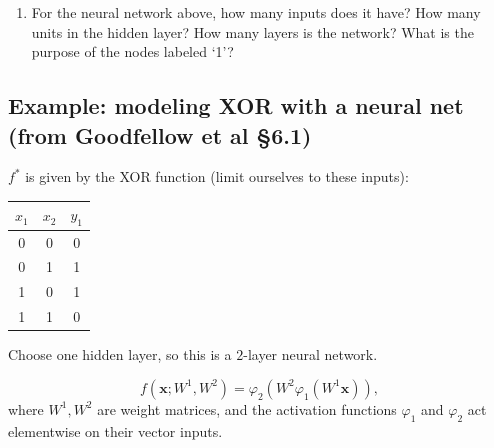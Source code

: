 \documentclass[12pt,letterpaper,noanswers]{exam}
\newcommand{\vc}[1]{\boldsymbol{#1}}
\newcommand{\note}[1]{{#1}} %
\begin{document}
\renewcommand{\inputnum}{3} 
\renewcommand{\hiddennum}{3}
\begin{enumerate}[resume=classQ]
    \item For the neural network above, how many inputs does it have?  How many units in the hidden layer?  How many layers is the network? What is the purpose of the nodes labeled `1'?
    \vspace{1cm}
\end{enumerate}

\subsection*{Example: modeling XOR with a neural net (from Goodfellow et al \S 6.1)}

\note{
$f^*$ is given by the XOR function (limit ourselves to these inputs):

\begin{tabular}{c | c|| c}
$x_1$ & $x_2$ & $y_1$ \\
\hline
0 & 0 & 0 \\
0 & 1 & 1 \\
1 & 0 & 1 \\
1 & 1 & 0 
\end{tabular}


Choose one hidden layer, so this is a $2$-layer neural network.

\[f(\vc{x}; W^1, W^2) = \varphi_2(W^2\varphi_1(W^1\vc{x})),\] where $W^1, W^2$ are weight matrices, and the activation functions $\varphi_1$ and $\varphi_2$ act elementwise on their vector inputs.
}
\end{document}
